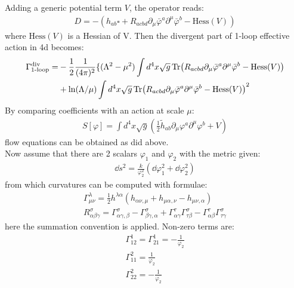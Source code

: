 Adding a generic potential term $V$, the operator reads:
\begin{align}
    D = -(h_{ab}\square + R_{acbd} \partial_{\mu} \bar{\varphi} ^{a} \partial^{\mu} \bar{\varphi} ^{b} - \text{Hess} (V))
\end{align}
where $\text{Hess}(V)$ is a Hessian of V. Then the divergent part of 1-loop effective action in 4d becomes:
\begin{align}
    \begin{split}
    \Gamma_{\text{1-loop}}^{\text{div}} = &-\frac{1}{2} \frac{1}{(4\pi)^{2}}\lbrace (\Lambda ^{2} - \mu ^{2})\int d^{4}x \sqrt{g} \Tr (R_{acbd} \partial_{\mu} \bar{\varphi} ^{a} \partial^{\mu} \bar{\varphi} ^{b} - \text{Hess} (V)) \\ 
    &+ \ln (\Lambda/\mu)\int d^{4}x \sqrt{g} \Tr(R_{acbd} \partial_{\mu} \bar{\varphi} ^{a} \partial^{\mu} \bar{\varphi} ^{b} - \text{Hess} (V))^{2}
    \end{split}
\end{align}
By comparing coefficients with an action at scale $\mu$:
\begin{align}
    S[\varphi] = \int d^{4}x \sqrt{g} (\frac{1}{2} \tilde h_{ab} \partial _{\mu} \varphi^{a} \partial ^{\mu} \varphi ^{b} + V)
\end{align}
flow equations can be obtained as did above. \\
\indent Now assume that there are 2 scalars $\varphi _{1}$ and $\varphi _{2}$ with the metric given:
\begin{align}
    \dd s^{2} = \frac{k}{\varphi_{2} ^{2}} (\dd \varphi_{1} ^{2} + \dd \varphi _{2} ^{2})
\end{align}
from which curvatures can be computed with formulae:
\begin{align}
    \Gamma _{\mu \nu}^{\lambda} = \frac{1}{2} h^{\lambda \alpha} (h_{\alpha \nu , \mu} + h_{\mu \alpha, \nu} - h_{\mu \nu ,\alpha}) \\
    R_{\alpha \beta \gamma} ^{\sigma} = \Gamma _{\alpha \gamma, \beta} ^{\sigma} - \Gamma _{\beta \gamma , \alpha} ^{\sigma} + \Gamma _{\alpha \gamma} ^{\tau} \Gamma _{\tau \beta} ^{\sigma} - \Gamma_{\alpha \beta}^{\tau} \Gamma_{\tau \gamma} ^{\sigma}
\end{align}
here the summation convention is applied. Non-zero terms are:
\begin{align}
    \label{eq:2.53}
    \Gamma _{12} ^{1} = \Gamma _{21}^{1} = -\frac{1}{\varphi _{2}} \\
    \label{eq:2.54}
    \Gamma _{11} ^{2} = \frac{1}{\varphi _{2}}\\
    \label{eq:2.55}
    \Gamma _{22}^{2} = -\frac{1}{\varphi _{2}}
\end{align}
